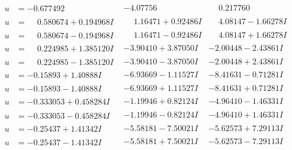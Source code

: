\documentclass[1p]{elsarticle_modified}
\theoremstyle{definition}
\begin{document}
$$\begin{array}{c|c|c}
\begin{aligned}
u &= -0.677492\phantom{ +0.000000I}\end{aligned}
 & -4.07756\phantom{ +0.000000I} & \phantom{-}0.217760\phantom{ +0.000000I} \\ \hline\begin{aligned}
u &= \phantom{-}0.580674 + 0.194968 I\end{aligned}
 & \phantom{-}1.16471 + 0.92486 I & \phantom{-}4.08147 - 1.66278 I \\ \hline\begin{aligned}
u &= \phantom{-}0.580674 - 0.194968 I\end{aligned}
 & \phantom{-}1.16471 - 0.92486 I & \phantom{-}4.08147 + 1.66278 I \\ \hline\begin{aligned}
u &= \phantom{-}0.224985 + 1.385120 I\end{aligned}
 & -3.90410 + 3.87050 I & -2.00448 - 2.43861 I \\ \hline\begin{aligned}
u &= \phantom{-}0.224985 - 1.385120 I\end{aligned}
 & -3.90410 - 3.87050 I & -2.00448 + 2.43861 I \\ \hline\begin{aligned}
u &= -0.15893 + 1.40888 I\end{aligned}
 & -6.93669 - 1.11527 I & -8.41631 - 0.71281 I \\ \hline\begin{aligned}
u &= -0.15893 - 1.40888 I\end{aligned}
 & -6.93669 + 1.11527 I & -8.41631 + 0.71281 I \\ \hline\begin{aligned}
u &= -0.333053 + 0.458284 I\end{aligned}
 & -1.19946 + 0.82124 I & -4.96410 - 1.46331 I \\ \hline\begin{aligned}
u &= -0.333053 - 0.458284 I\end{aligned}
 & -1.19946 - 0.82124 I & -4.96410 + 1.46331 I \\ \hline\begin{aligned}
u &= -0.25437 + 1.41342 I\end{aligned}
 & -5.58181 - 7.50021 I & -5.62573 + 7.29113 I \\ \hline\begin{aligned}
u &= -0.25437 - 1.41342 I\end{aligned}
 & -5.58181 + 7.50021 I & -5.62573 - 7.29113 I \\ \hline\begin{aligned}

\end{aligned}
\end{array}$$
\end{document}
